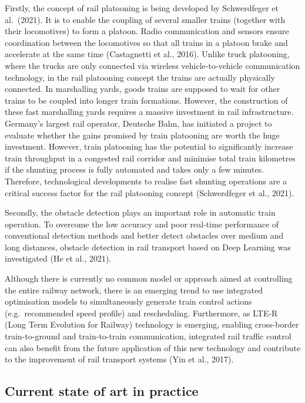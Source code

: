 \documentclass[
]{book}
\begin{document}
Firstly, the concept of rail platooning is being developed by Schwerdfeger et al.~(2021). It is to enable the coupling of several smaller trains (together with their locomotives) to form a platoon. Radio communication and sensors ensure coordination between the locomotives so that all trains in a platoon brake and accelerate at the same time (Castagnetti et al., 2016). Unlike truck platooning, where the trucks are only connected via wireless vehicle-to-vehicle communication technology, in the rail platooning concept the trains are actually physically connected. In marshalling yards, goods trains are supposed to wait for other trains to be coupled into longer train formations. However, the construction of these fast marshalling yards requires a massive investment in rail infrastructure. Germany's largest rail operator, Deutsche Bahn, has initiated a project to evaluate whether the gains promised by train platooning are worth the huge investment. However, train platooning has the potential to significantly increase train throughput in a congested rail corridor and minimise total train kilometres if the shunting process is fully automated and takes only a few minutes. Therefore, technological developments to realise fast shunting operations are a critical success factor for the rail platooning concept (Schwerdfeger et al., 2021).

Secondly, the obstacle detection plays an important role in automatic train operation. To overcome the low accuracy and poor real-time performance of conventional detection methods and better detect obstacles over medium and long distances, obstacle detection in rail transport based on Deep Learning was investigated (He et al., 2021).

Although there is currently no common model or approach aimed at controlling the entire railway network, there is an emerging trend to use integrated optimisation models to simultaneously generate train control actions (e.g.~recommended speed profile) and rescheduling. Furthermore, as LTE-R (Long Term Evolution for Railway) technology is emerging, enabling cross-border train-to-ground and train-to-train communication, integrated rail traffic control can also benefit from the future application of this new technology and contribute to the improvement of rail transport systems (Yin et al., 2017).

\hypertarget{current-state-of-art-in-practice-40}{%
\subsection*{Current state of art in practice}\label{current-state-of-art-in-practice-40}}
\end{document}
